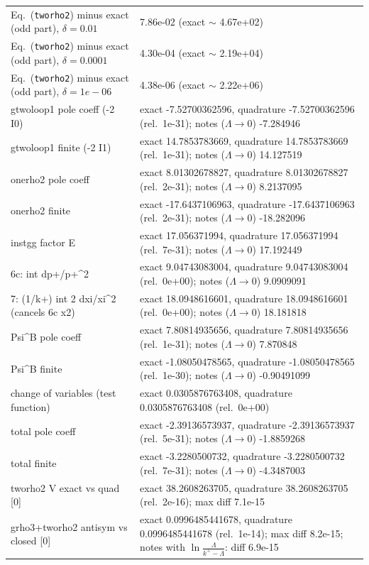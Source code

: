 \documentclass[10pt]{article}
\newcommand{\eqn}[1]{Eq.~(\texttt{#1})}
\begin{document}
\begin{center}
\begin{longtable}{@{}p{}p{}@{}}
\eqn{tworho2} minus exact (odd part), $\delta=0.01$ & 7.86e-02 (exact $\sim$ 4.67e+02)\\
\eqn{tworho2} minus exact (odd part), $\delta=0.0001$ & 4.30e-04 (exact $\sim$ 2.19e+04)\\
\eqn{tworho2} minus exact (odd part), $\delta=1e-06$ & 4.38e-06 (exact $\sim$ 2.22e+06)\\
gtwoloop1 pole coeff (-2 I0) & exact -7.52700362596, quadrature -7.52700362596 (rel.\ 1e-31); notes ($\Lambda\to0$) -7.284946\\
gtwoloop1 finite (-2 I1) & exact 14.7853783669, quadrature 14.7853783669 (rel.\ 1e-31); notes ($\Lambda\to0$) 14.127519\\
onerho2 pole coeff & exact 8.01302678827, quadrature 8.01302678827 (rel.\ 2e-31); notes ($\Lambda\to0$) 8.2137095\\
onerho2 finite & exact -17.6437106963, quadrature -17.6437106963 (rel.\ 2e-31); notes ($\Lambda\to0$) -18.282096\\
instgg factor E & exact 17.056371994, quadrature 17.056371994 (rel.\ 7e-31); notes ($\Lambda\to0$) 17.192449\\
6c: int dp+/p+\^{}2 & exact 9.04743083004, quadrature 9.04743083004 (rel.\ 0e+00); notes ($\Lambda\to0$) 9.0909091\\
7: (1/k+) int 2 dxi/xi\^{}2 (cancels 6c x2) & exact 18.0948616601, quadrature 18.0948616601 (rel.\ 0e+00); notes ($\Lambda\to0$) 18.181818\\
Psi\^{}B pole coeff & exact 7.80814935656, quadrature 7.80814935656 (rel.\ 1e-31); notes ($\Lambda\to0$) 7.870848\\
Psi\^{}B finite & exact -1.08050478565, quadrature -1.08050478565 (rel.\ 1e-30); notes ($\Lambda\to0$) -0.90491099\\
change of variables (test function) & exact 0.0305876763408, quadrature 0.0305876763408 (rel.\ 0e+00)\\
total pole coeff & exact -2.39136573937, quadrature -2.39136573937 (rel.\ 5e-31); notes ($\Lambda\to0$) -1.8859268\\
total finite & exact -3.2280500732, quadrature -3.2280500732 (rel.\ 7e-31); notes ($\Lambda\to0$) -4.3487003\\
tworho2 V exact vs quad [0] & exact 38.2608263705, quadrature 38.2608263705 (rel.\ 2e-16); max diff 7.1e-15\\
grho3+tworho2 antisym vs closed [0] & exact 0.0996485441678, quadrature 0.0996485441678 (rel.\ 1e-14); max diff 8.2e-15; notes with $\ln\frac{\Lambda}{k^+-\Lambda}$: diff 6.9e-15\\

\end{longtable}
\end{center}
\end{document}
